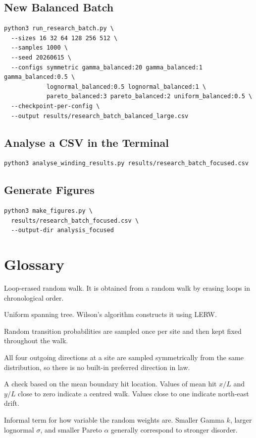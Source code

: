 \documentclass[11pt]{article}
\begin{document}
\subsection{New Balanced Batch}
\begin{verbatim}
python3 run_research_batch.py \
  --sizes 16 32 64 128 256 512 \
  --samples 1000 \
  --seed 20260615 \
  --configs symmetric gamma_balanced:20 gamma_balanced:1 gamma_balanced:0.5 \
            lognormal_balanced:0.5 lognormal_balanced:1 \
            pareto_balanced:3 pareto_balanced:2 uniform_balanced:0.5 \
  --checkpoint-per-config \
  --output results/research_batch_balanced_large.csv
\end{verbatim}

\subsection{Analyse a CSV in the Terminal}
\begin{verbatim}
python3 analyse_winding_results.py results/research_batch_focused.csv
\end{verbatim}

\subsection{Generate Figures}
\begin{verbatim}
python3 make_figures.py \
  results/research_batch_focused.csv \
  --output-dir analysis_focused
\end{verbatim}

\section{Glossary}

\begin{description}[leftmargin=3.0cm,style=nextline]
  \item[LERW]
  Loop-erased random walk. It is obtained from a random walk by erasing loops in
  chronological order.

  \item[UST]
  Uniform spanning tree. Wilson's algorithm constructs it using LERW.

  \item[Fixed environment]
  Random transition probabilities are sampled once per site and then kept fixed
  throughout the walk.

  \item[Locally balanced]
  All four outgoing directions at a site are sampled symmetrically from the
  same distribution, so there is no built-in preferred direction in law.

  \item[Drift diagnostic]
  A check based on the mean boundary hit location. Values of mean hit $x/L$ and
  $y/L$ close to zero indicate a centred walk. Values close to one indicate
  north-east drift.

  \item[Disorder strength]
  Informal term for how variable the random weights are. Smaller Gamma $k$,
  larger lognormal $\sigma$, and smaller Pareto $\alpha$ generally correspond
  to stronger disorder.
\end{description}
\end{document}
